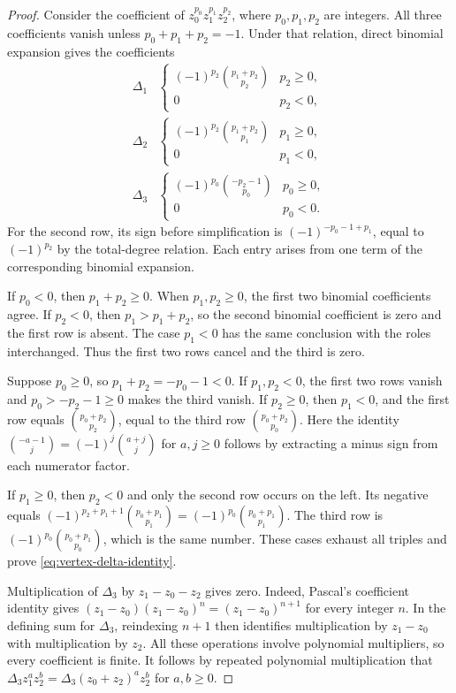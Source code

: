 \begin{proof}
Consider the coefficient of $z_0^{p_0} z_1^{p_1} z_2^{p_2}$, where $p_0,p_1,p_2$
are integers. All three coefficients vanish unless $p_0+p_1+p_2=-1$.
Under that relation, direct binomial expansion gives the coefficients
\[
 \begin{array}{c|c}
 \Delta_1&
   \begin{cases}(-1)^{p_2}\binom{p_1+p_2}{p_2}&p_2\geq0,\\0&p_2<0,
   \end{cases}\\[4pt]
 \Delta_2&
   \begin{cases}(-1)^{p_2}\binom{p_1+p_2}{p_1}&p_1\geq0,\\0&p_1<0,
   \end{cases}\\[4pt]
 \Delta_3&
   \begin{cases}(-1)^{p_0}\binom{-p_2-1}{p_0}&p_0\geq0,\\0&p_0<0.
   \end{cases}
 \end{array}
\]
For the second row, its sign before simplification is
$(-1)^{-p_0-1+p_1}$, equal to $(-1)^{p_2}$ by the total-degree relation.
Each entry arises from one term of the corresponding binomial expansion.

If $p_0<0$, then $p_1+p_2\geq0$.
When $p_1,p_2\geq0$, the first two binomial coefficients agree.
If $p_2<0$, then $p_1>p_1+p_2$, so the second binomial coefficient is zero
and the first row is absent.
The case $p_1<0$ has the same conclusion with the roles interchanged.
Thus the first two rows cancel and the third is zero.

Suppose $p_0\geq0$, so $p_1+p_2=-p_0-1<0$.
If $p_1,p_2<0$, the first two rows vanish and
$p_0>-p_2-1\geq0$ makes the third vanish.
If $p_2\geq0$, then $p_1<0$, and the first row equals
$\binom{p_0+p_2}{p_2}$, equal to the third row $\binom{p_0+p_2}{p_0}$.
Here the identity $\binom{-a-1}{j}=(-1)^j\binom{a+j}{j}$
for $a,j\geq0$ follows by extracting a minus sign from each numerator factor.

If $p_1\geq0$, then $p_2<0$ and only the second row occurs on the left.
Its negative equals
$(-1)^{p_2+p_1+1}\binom{p_0+p_1}{p_1}=(-1)^{p_0}\binom{p_0+p_1}{p_1}$.
The third row is $(-1)^{p_0}\binom{p_0+p_1}{p_0}$, which is the same number.
These cases exhaust all triples and prove \eqref{eq:vertex-delta-identity}.

Multiplication of $\Delta_3$ by $z_1-z_0-z_2$ gives zero.
Indeed, Pascal's coefficient identity gives
$(z_1-z_0)(z_1-z_0)^n=(z_1-z_0)^{n+1}$ for every integer $n$.
In the defining sum for $\Delta_3$, reindexing $n+1$ then identifies
multiplication by $z_1-z_0$ with multiplication by $z_2$.
All these operations involve polynomial multipliers, so every coefficient is finite.
It follows by repeated polynomial multiplication that
$\Delta_3z_1^az_2^b=\Delta_3(z_0+z_2)^az_2^b$ for $a,b\geq0$.


\end{proof}
